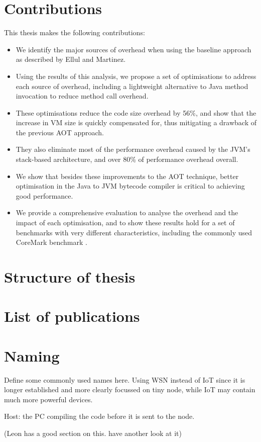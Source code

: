 \section{Contributions}
This thesis makes the following contributions:
\begin{itemize}
	\item We identify the major sources of overhead when using the baseline approach as described by Ellul and Martinez.
	\item Using the results of this analysis, we propose a set of optimisations to address each source of overhead, including a lightweight alternative to Java method invocation to reduce method call overhead.
	\item These optimisations reduce the code size overhead by 56\%, and show that the increase in VM size is quickly compensated for, thus mitigating a drawback of the previous AOT approach.
	\item They also eliminate most of the performance overhead caused by the JVM's stack-based architecture, and over 80\% of performance overhead overall.
	\item We show that besides these improvements to the AOT technique, better optimisation in the Java to JVM bytecode compiler is critical to achieving good performance.
	\item We provide a comprehensive evaluation to analyse the overhead and the impact of each optimisation, and to show these results hold for a set of benchmarks with very different characteristics, including the commonly used CoreMark benchmark \cite{coremark}.
\end{itemize}

\section{Structure of thesis}

\section{List of publications}

\section{Naming}

Define some commonly used names here. Using WSN instead of IoT since it is longer established and more clearly focussed on tiny node, while IoT may contain much more powerful devices.

Host: the PC compiling the code before it is sent to the node.

(Leon has a good section on this. have another look at it)